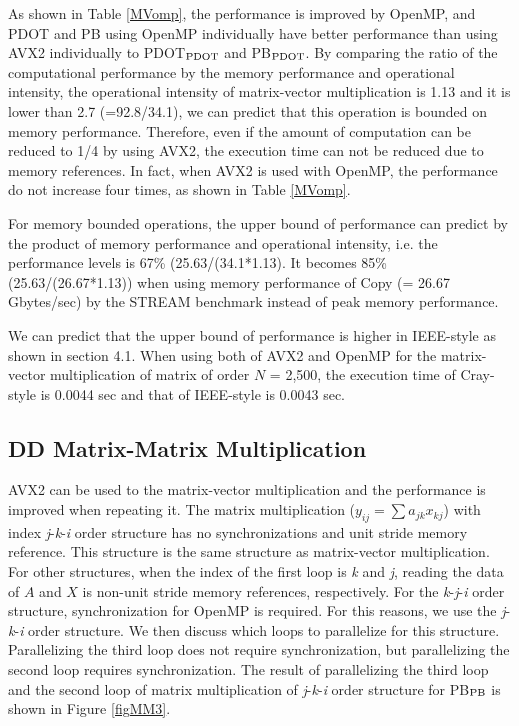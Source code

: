 \documentclass{IOS-Book-Article}
\begin{document}
As shown in Table \ref{MVomp}, the performance is improved by OpenMP, and PDOT and PB using OpenMP individually have better performance than using AVX2 individually to PDOT$_{\rm{PDOT}}$ and PB$_{\rm{PDOT}}$. 
By comparing the ratio of the computational performance by the memory performance and operational intensity, the operational intensity of matrix-vector multiplication is 1.13 and it is lower than 2.7 (=92.8/34.1), we can predict that this operation is bounded on memory performance.
Therefore, even if the amount of computation can be reduced to 1/4 by using AVX2, the execution time can not be reduced due to memory references. 
In fact, when AVX2 is used with OpenMP, the performance do not increase four times, as shown in Table \ref{MVomp}.

For memory bounded operations, the upper bound of performance can predict by the product of memory performance and operational intensity, i.e. the performance levels is 67\% (25.63/(34.1*1.13). It becomes 85\% (25.63/(26.67*1.13)) when using memory performance of Copy (= 26.67 Gbytes/sec) by the STREAM benchmark instead of peak memory performance.

We can predict that the upper bound of performance is higher in IEEE-style as shown in section 4.1. When using both of AVX2 and OpenMP for the matrix-vector multiplication of matrix of order $N$ = 2,500, the execution time of Cray-style is 0.0044 sec and that of IEEE-style is 0.0043 sec.

\subsection{DD Matrix-Matrix Multiplication}
AVX2 can be used to the matrix-vector multiplication and the performance is improved when repeating it. The matrix multiplication ($y_{ij}=\sum a_{jk}x_{kj}$) with index {\it j}-{\it k}-{\it i} order structure has no synchronizations and unit stride memory reference. This structure is the same structure as matrix-vector multiplication. For other structures, when the index of the first loop is {\it k} and {\it j}, reading the data of $A$ and $X$ is non-unit stride memory references, respectively. For the {\it k}-{\it j}-{\it i} order structure, synchronization for OpenMP is required. For this reasons, we use the {\it j}-{\it k}-{\it i} order structure. We then discuss which loops to parallelize for this structure. Parallelizing the third loop does not require synchronization, but parallelizing the second loop requires synchronization.
The result of parallelizing the third loop and the second loop of matrix multiplication of {\it j}-{\it k}-{\it i} order structure for PB$_{\rm{PB}}$ is shown in Figure \ref{figMM3}.
\end{document}
